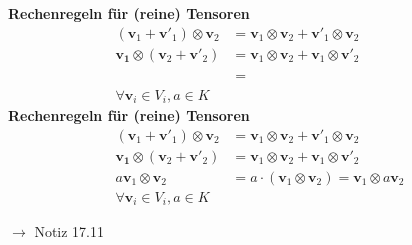 \documentclass[11pt]{article}
\renewcommand{\cite}[1]{\par\bigskip\hfill{\color{gray}\tiny\(\to\) #1}}
\renewcommand{\vec}[1]{\mathbf{#1}}
\newenvironment{field}{}{\newpage}
\newif\ifnote
\newenvironment{note}{\notetrue}{\notefalse}
\begin{document}
\begin{note}
    \begin{field}
        \textbf{Rechenregeln für (reine) Tensoren}
        \begin{align*}
            (\vec{v}_1 + \vec{v}'_1) \otimes \vec{v}_2 &= \vec{v}_1 \otimes \vec{v}_2 + \vec{v}'_1 \otimes \vec{v}_2\\
            \vec{v_1} \otimes (\vec{v}_2 + \vec{v}'_2) &= \vec{v}_1 \otimes \vec{v}_2 + \vec{v}_1 \otimes \vec{v}'_2\\
            \phantom{a\vec{v}_1 \otimes \vec{v}_2} &= \phantom{a \cdot (\vec{v}_1\otimes \vec{v}_2) = \vec{v}_1 \otimes a\vec{v}_2}\\
            \forall \vec{v}_i\in V_i, a\in K
        \end{align*}
    \end{field}
    \begin{field}
        \textbf{Rechenregeln für (reine) Tensoren}
        \begin{align*}
            (\vec{v}_1 + \vec{v}'_1) \otimes \vec{v}_2 &= \vec{v}_1 \otimes \vec{v}_2 + \vec{v}'_1 \otimes \vec{v}_2\\
            \vec{v_1} \otimes (\vec{v}_2 + \vec{v}'_2) &= \vec{v}_1 \otimes \vec{v}_2 + \vec{v}_1 \otimes \vec{v}'_2\\
            a\vec{v}_1 \otimes \vec{v}_2 &= a \cdot (\vec{v}_1\otimes \vec{v}_2) = \vec{v}_1 \otimes a\vec{v}_2\\
            \forall \vec{v}_i\in V_i, a\in K
        \end{align*}
        \cite{Notiz 17.11}
    \end{field}
\end{note}
\end{document}
